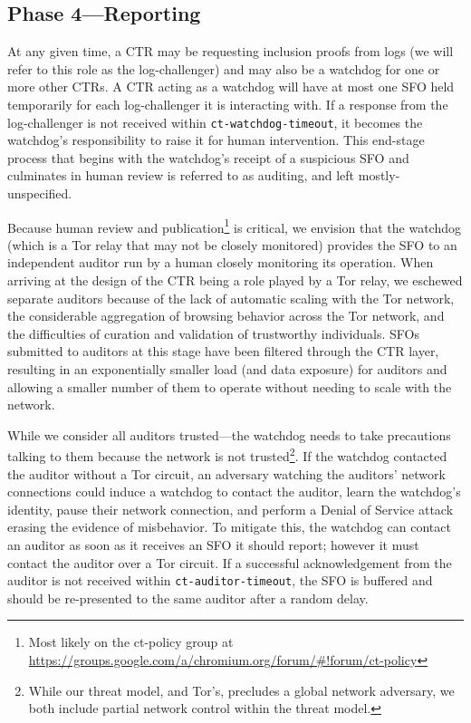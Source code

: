 \subsection{Phase 4---Reporting}

At any given time, a CTR may be requesting inclusion proofs from logs (we will refer to this role as the log-challenger) and may also be a watchdog for one or more other CTRs. A CTR acting as a watchdog will have at most one SFO held temporarily for each log-challenger it is interacting with. If a response from the log-challenger is not received within \texttt{ct-watchdog-timeout}, it becomes the watchdog's responsibility to raise it for human intervention. This end-stage process that begins with the watchdog's receipt of a suspicious SFO and culminates in human review is referred to as auditing, and left mostly-unspecified.

Because human review and publication\footnote{Most likely on the ct-policy group
at \url{https://groups.google.com/a/chromium.org/forum/\#!forum/ct-policy}} is critical, we envision that the watchdog (which is a Tor relay that may not be closely monitored) provides the SFO to an independent auditor run by a human closely monitoring its operation. When arriving at the design of the CTR being a role played by a Tor relay, we eschewed separate auditors because of the lack of automatic scaling with the Tor network, the considerable aggregation of browsing behavior across the Tor network, and the difficulties of curation and validation of trustworthy individuals. SFOs submitted to auditors at this stage have been filtered through the CTR layer, resulting in an exponentially smaller load (and data exposure) for auditors and allowing a smaller number of them to operate without needing to scale with the network.

While we consider all auditors trusted---the watchdog needs to take precautions talking to them because the network is not trusted\footnote{While our threat model, and Tor's, precludes a global network adversary, we both include partial network control within the threat model.}. If the watchdog contacted the auditor without a Tor circuit, an adversary watching the auditors' network connections could induce a watchdog to contact the auditor, learn the watchdog's identity, pause their network connection, and perform a Denial of Service attack erasing the evidence of misbehavior. To mitigate this, the watchdog can contact an auditor as soon as it receives an SFO it should report; however it must contact the auditor over a Tor circuit. If a successful acknowledgement from the auditor is not received within \texttt{ct-auditor-timeout}, the SFO is buffered and should be re-presented to the same auditor after a random delay.

